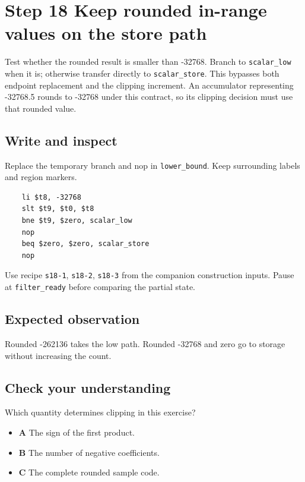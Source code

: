 \section{Step 18 Keep rounded in-range values on the store path}\label{fir-s18}

Test whether the rounded result is smaller than -32768. Branch to \texttt{scalar\_low} when it is; otherwise transfer directly to \texttt{scalar\_store}. This bypasses both endpoint replacement and the clipping increment. An accumulator representing -32768.5 rounds to -32768 under this contract, so its clipping decision must use that rounded value.

\subsection{Write and inspect}
Replace the temporary branch and nop in \texttt{lower\_bound}. Keep surrounding labels and region markers.

\begin{verbatim}
    li $t8, -32768
    slt $t9, $t0, $t8
    bne $t9, $zero, scalar_low
    nop
    beq $zero, $zero, scalar_store
    nop
\end{verbatim}
Use recipe \texttt{s18-1}, \texttt{s18-2}, \texttt{s18-3} from the companion construction inputs. Pause at \texttt{filter\_ready} before comparing the partial state.

\subsection{Expected observation}
Rounded -262136 takes the low path. Rounded -32768 and zero go to storage without increasing the count.

\subsection{Check your understanding}
Which quantity determines clipping in this exercise?

\begin{itemize}
  \item \textbf{A} The sign of the first product.
  \item \textbf{B} The number of negative coefficients.
  \item \textbf{C} The complete rounded sample code.
\end{itemize}
